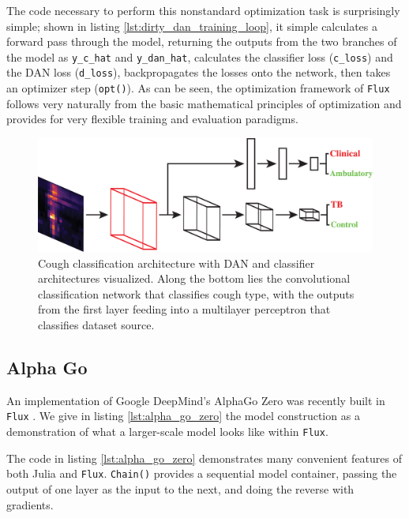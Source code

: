\documentclass{juliacon}
\begin{document}
The code necessary to perform this nonstandard optimization task is surprisingly simple; shown in listing \ref{lst:dirty_dan_training_loop}, it simple calculates a forward pass through the model, returning the outputs from the two branches of the model as \texttt{y\_c\_hat} and \texttt{y\_dan\_hat}, calculates the classifier loss (\texttt{c\_loss}) and the DAN loss (\texttt{d\_loss}), backpropagates the losses onto the network, then takes an optimizer step (\texttt{opt()}).  As can be seen, the optimization framework of \texttt{Flux} follows very naturally from the basic mathematical principles of optimization and provides for very flexible training and evaluation paradigms.

\begin{figure}[ht]
  \centering
  \includegraphics[width=.95\linewidth]{figures/DANArch_red.eps}
  \caption{Cough classification architecture with DAN and classifier architectures visualized.  Along the bottom lies the convolutional classification network that classifies cough type, with the outputs from the first layer feeding into a multilayer perceptron that classifies dataset source.}
  \label{fig:dirty_dan}
\end{figure}

\subsection{Alpha Go}

An implementation of Google DeepMind's AlphaGo Zero \cite{AlphaGoZero} was recently built in \texttt{Flux} \cite{AlphaGo.jl}. We give in listing \ref{lst:alpha_go_zero} the model construction as a demonstration of what a larger-scale model looks like within \texttt{Flux}.

The code in listing \ref{lst:alpha_go_zero} demonstrates many convenient features of both Julia and \texttt{Flux}. \texttt{Chain()} provides a sequential model container, passing the output of one layer as the input to the next, and doing the reverse with gradients.
\end{document}
